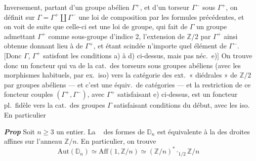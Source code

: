 \documentclass[11pt,a4paper]{article}
\begin{document}
Inversement, partant d'un groupe abélien $\Gamma^{+}$, et d'un torseur
$\Gamma^{-}$ sous $\Gamma^{+}$, on définit sur
$\Gamma = \Gamma^{+} \amalg \Gamma^{-}$ une  loi de
composition par les formules précédentes, et on voit de suite que celle-ci
est une loi de groupe, qui fait de $\Gamma$ un groupe admettant $\Gamma^{+}$
comme sous-groupe  d'indice 2, l'extension de $\mathbb{Z}/2$
par $\Gamma^{+}$ ainsi obtenue donnant lieu à  \struck{\ill{} \ill{}} de $\Gamma^{+}$, et étant scindée
 n'importe quel élément de $\Gamma^{-}$. [Donc $\Gamma$,
$\Gamma^{+}$ satisfont les conditions a) à d) ci-dessus, mais pas néc.\ e)]
On trouve donc un foncteur qui va de la cat.\ des torseurs sous groupes
abéliens (avec les morphismes habituels, par ex.\ iso) vers la catégorie
des ext.\ « diédrales » de $\mathbb{Z}/2$ par groupes abéliens --- et c'est
une équiv.\ de catégories --- et la restriction de ce foncteur   couples $(\Gamma^{+}, \Gamma^{-})$, avec
$\Gamma^{+}$ satisfaisant e) ci-dessus,  est un
foncteur pl.\ fidèle vers la cat.\ des groupes $\Gamma$ satisfaisant
 conditions du début, avec les iso. En particulier

\textbf{\emph{Prop}} Soit $n \geq 3$ un entier. La \
  des formes de $\mathbb{D}_n$ est
équivalente à la \struck{catégorie} \add{\uncertain{gerbe}} des droites
affines sur l'anneau $\mathbb{Z}/n$. En particulier, on trouve
\[
  \mathrm{Aut}(\mathbb{D}_n) \simeq \mathrm{Aff}(1, \mathbb{Z}/n) \simeq (\mathbb{Z}/n)^{*} \cdot_{1/2} \mathbb{Z}/n
\]
\end{document}
